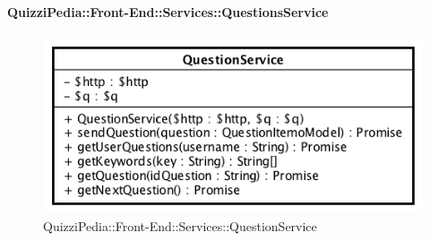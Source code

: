 \paragraph{QuizziPedia::Front-End::Services::QuestionsService}

\label{QuizziPedia::Front-End::Services::QuestionService}
\begin{figure}[ht]
	\centering
	\includegraphics[scale=0.60]{UML/Classi/Front-End/QuizziPedia_Front-end_Services_QuestionService.png}
	\caption{QuizziPedia::Front-End::Services::QuestionService}
\end{figure}\FloatBarrier
